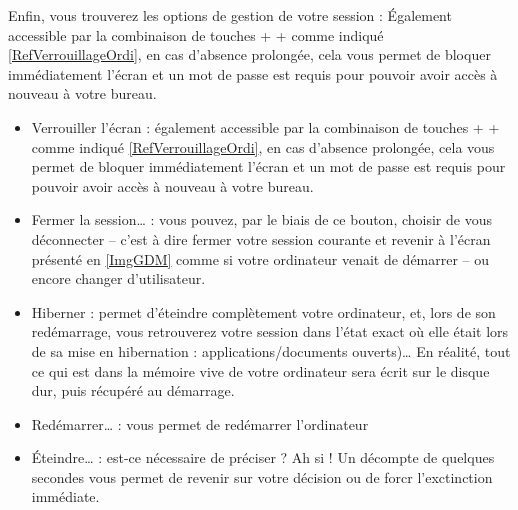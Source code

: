 Enfin, vous trouverez les options de gestion de votre session : Également accessible par la combinaison de touches  +  +  comme indiqué \ref{RefVerrouillageOrdi}, en cas d'absence prolongée, cela vous permet de bloquer immédiatement l'écran et un mot de passe est requis pour pouvoir avoir accès à nouveau à votre bureau.
\begin{itemize}
\item Verrouiller l'écran : également accessible par la combinaison de touches  +  +  comme indiqué \ref{RefVerrouillageOrdi}, en cas d'absence prolongée, cela vous permet de bloquer immédiatement l'écran et un mot de passe est requis pour pouvoir avoir accès à nouveau à votre bureau.
\item Fermer la session\ldots{} : vous pouvez, par le biais de ce bouton, choisir de vous déconnecter -- c'est à dire fermer votre session courante et revenir à l'écran présenté en \ref{ImgGDM} comme si votre ordinateur venait de démarrer -- ou encore changer d'utilisateur.
\item Hiberner : permet d'éteindre complètement votre ordinateur, et, lors de son redémarrage, vous retrouverez votre session dans l'état exact où elle était lors de sa mise en hibernation : applications/documents ouverts)\ldots{} En réalité, tout ce qui est dans la mémoire vive de votre ordinateur sera écrit sur le disque dur, puis récupéré au démarrage.
\item Redémarrer\ldots{} : vous permet de redémarrer l'ordinateur
\item Éteindre\ldots{} : est-ce nécessaire de préciser ? Ah si ! Un décompte de quelques secondes vous permet de revenir sur votre décision ou de forcr l'exctinction immédiate.
\end{itemize}
